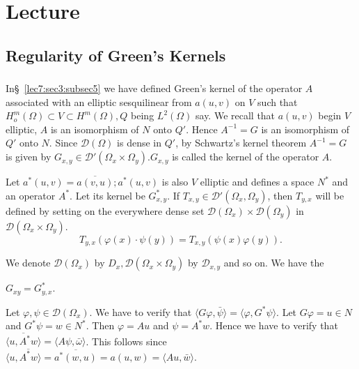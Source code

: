 \chapter{Lecture}\label{lec23} %

\setcounter{section}{11}
\section{Regularity of Green's Kernels}\label{lec23:sec12}%

\subsection{}\label{lec23:sec12:subsec1}

In\pageoriginale \S\ \ref{lec7:sec3:subsec5} we have defined Green's kernel of the operator $A$
associated with an elliptic sesquilinear from $a(u, v)$ on $V$ such
that $H^m_o (\Omega) \subset V \subset H^m (\Omega), Q$ being $L^2
(\Omega)$ say. We recall that $a(u, v)$ begin $V$ elliptic, $A$ is an
isomorphism of $N$ onto $Q'$. Hence $A^{-1} = G$ is an isomorphism of
$Q'$ onto $N$. Since $\mathscr{D} (\Omega)$ is dense in $Q'$, by
Schwartz's kernel theorem $A^{-1} = G$ is given by $G_{x, y}
\in \mathscr{D}' (\Omega_x \times \Omega_y). G_{x, y}$ is
called the kernel of the operator $A$.  

Let $a^* (u, v) = \overline{a(v, u)} ; a^* (u, v)$ is also
$V$ elliptic and defines a space $N^*$ and an operator $A^*$. Let
its kernel be $G^*_{x, y}$. If $T_{x, y} \in \mathscr{D}'
(\Omega_x, \Omega_y)$, then $T_{y, x}$ will be defined by setting on
the everywhere dense set $\mathscr{D} (\Omega_x) \times \mathscr{D}
(\Omega_y) $ in $\mathscr{D}(\Omega_x \times \Omega_y)$.  
$$
T_{y, x} (\varphi (x) \cdot \psi (y)) = T_{x, y } (\psi (x)
\varphi (y)).  
$$

We denote $\mathscr{D} (\Omega_x) $ by $D_x, \mathscr{D} (\Omega_x
\times \Omega_y)$ by $\mathscr{D}_{x, y}$ and so on. We have the 
\begin{proposition}\label{lec23:sec12:subsec1:prop12.1} %
  $G_{xy} = G^*_{y, x}$. 
\end{proposition}

Let $\varphi, \psi \in \mathscr{D} (\Omega_x)$. We have to
verify that $\langle G \varphi, \bar{\psi} \rangle = \langle \varphi,
G^* \psi \rangle$. Let $G \varphi = u \in N$ and $G^* \psi = w
\in N^*$. Then $\varphi = Au$ and $\psi = A^* w$. Hence we have
to verify that $\overline{\langle u, A^* w \rangle}= \langle A \psi, \bar{\omega} \rangle$. This follows since $\langle
u, \overline{A^* w} \rangle = \overline{a^* (w, u)} = a(u, w) = \langle A u,
\bar{w}\rangle$.
  
